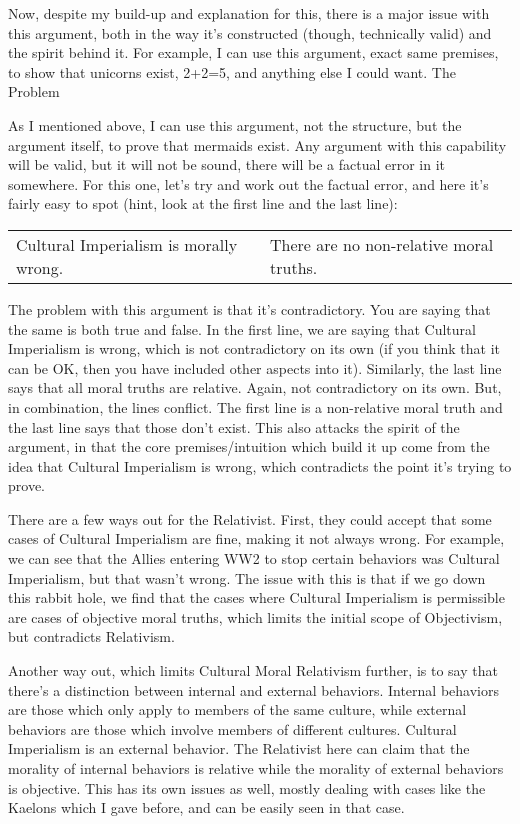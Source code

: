 Now, despite my build-up and explanation for this, there is a major issue with this argument, both in the way it's constructed (though, technically valid) and the spirit behind it. For example, I can use this argument, exact same premises, to show that unicorns exist, 2+2=5, and anything else I could want. 
The Problem

As I mentioned above, I can use this argument, not the structure, but the argument itself, to prove that mermaids exist. Any argument with this capability will be valid, but it will not be sound, there will be a factual error in it somewhere. For this one, let's try and work out the factual error, and here it's fairly easy to spot (hint, look at the first line and the last line):
\begin{tabular}{p{2in}|p{2in}}
Cultural Imperialism is morally wrong.&There are no non-relative moral truths.
\end{tabular}
The problem with this argument is that it's contradictory. You are saying that the same is both true and false. In the first line, we are saying that Cultural Imperialism is wrong, which is not contradictory on its own (if you think that it can be OK, then you have included other aspects into it). Similarly, the last line says that all moral truths are relative. Again, not contradictory on its own. But, in combination, the lines conflict. The first line is a non-relative moral truth and the last line says that those don't exist. This also attacks the spirit of the argument, in that the core premises/intuition which build it up come from the idea that Cultural Imperialism is wrong, which contradicts the point it's trying to prove. 

There are a few ways out for the Relativist. First, they could accept that some cases of Cultural Imperialism are fine, making it not always wrong. For example, we can see that the Allies entering WW2 to stop certain behaviors was Cultural Imperialism, but that wasn't wrong. The issue with this is that if we go down this rabbit hole, we find that the cases where Cultural Imperialism is permissible are cases of objective moral truths, which limits the initial scope of Objectivism, but contradicts Relativism. 

Another way out, which limits Cultural Moral Relativism further, is to say that there's a distinction between internal and external behaviors. Internal behaviors are those which only apply to members of the same culture, while external behaviors are those which involve members of different cultures. Cultural Imperialism is an external behavior. The Relativist here can claim that the morality of internal behaviors is relative while the morality of external behaviors is objective. This has its own issues as well, mostly dealing with cases like the Kaelons which I gave before, and can be easily seen in that case. 

